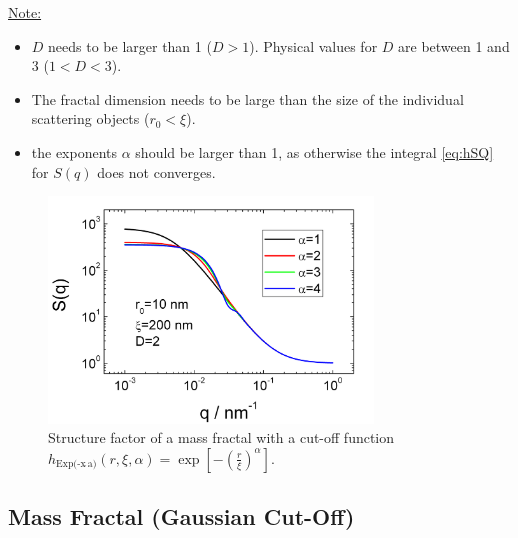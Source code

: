 \underline{Note:}
\begin{itemize}
\item $D$ needs to be larger than 1 ($D>1$). Physical values for $D$ are between 1 and 3 ($1<D<3$).
\item The fractal dimension needs to be large than the size of the individual scattering objects ($r_0 < \xi$).
\item the exponents $\alpha$ should be larger than 1, as otherwise the integral \ref{eq:hSQ} for $S(q)$ does not converges.
\end{itemize}

\begin{figure}[htb]
\begin{center}
\includegraphics[width=0.768\textwidth]{../images/structure_factor/MassFractals/SQExp(pow(x,a))CutOff.png}
\end{center}
\caption{Structure factor of a mass fractal with a cut-off function
$h_\text{Exp(-x$\hat{~}$a)}(r,\xi,\alpha) = \exp\left[-\left(\tfrac{r}{\xi}\right)^\alpha\right]$.}
\label{fig:SQExpxaCutOff}
\end{figure}


\clearpage
\subsection{Mass Fractal (Gaussian Cut-Off)}
~\\

